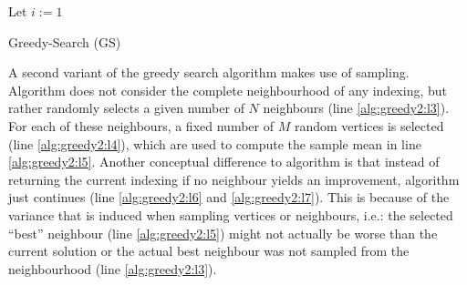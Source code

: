 \begin{algorithm}[ht]
    \SetAlgoLined
    \DontPrintSemicolon
    Let $i := 1$ \;
    \Return{$\idx$}
    \caption{Greedy-Search (GS)} \label{alg:greedy1}
\end{algorithm}

A second variant of the greedy search algorithm makes use of sampling. Algorithm \emph{} does not consider the complete neighbourhood of any indexing, but rather randomly selects a given number of $N$ neighbours (line \ref{alg:greedy2:l3}). For each of these neighbours, a fixed number of $M$ random vertices is selected (line \ref{alg:greedy2:l4}), which are used to compute the sample mean in line \ref{alg:greedy2:l5}. Another conceptual difference to algorithm \emph{} is that instead of returning the current indexing if no neighbour yields an improvement, algorithm \emph{} just continues (line \ref{alg:greedy2:l6} and \ref{alg:greedy2:l7}). This is because of the variance that is induced when sampling vertices or neighbours, i.e.: the selected ``best'' neighbour (line \ref{alg:greedy2:l5}) might not actually be worse than the current solution or the actual best neighbour was not sampled from the neighbourhood (line \ref{alg:greedy2:l3}).

